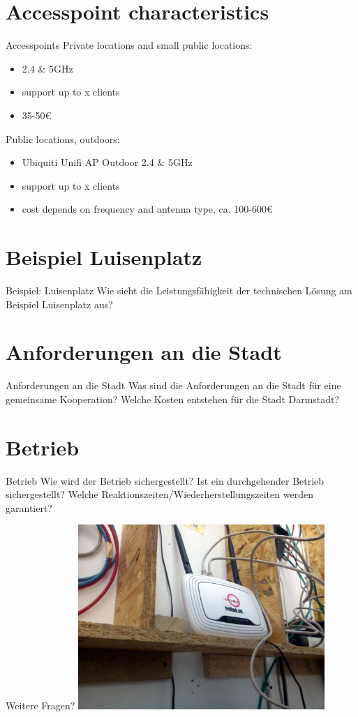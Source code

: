 \documentclass{beamer}
\begin{document}
\section{Accesspoint characteristics}
\begin{frame}{Accesspoints}
\vfill
Private locations and small public locations:
\begin{itemize}
\item 2.4 \& 5GHz
\item support up to x clients
\item 35-50\euro{}
\end{itemize}
\vfill

Public locations, outdoors:
\begin{itemize}
\item Ubiquiti Unifi AP Outdoor 2.4 \& 5GHz
\item support up to x clients
\item cost depends on frequency and antenna type, ca. 100-600\euro{}
\end{itemize}
\vfill
\end{frame}

\section{Beispiel Luisenplatz}
\begin{frame}{Beispiel: Luisenplatz}
Wie sieht die Leistungsfähigkeit der technischen Lösung am Beispiel Luisenplatz aus?
\end{frame}

\section{Anforderungen an die Stadt}
\begin{frame}{Anforderungen an die Stadt}
Was sind die Anforderungen an die Stadt für eine gemeinsame Kooperation?
Welche Kosten entstehen für die Stadt Darmstadt?
\end{frame}

\section{Betrieb}
\begin{frame}{Betrieb}
Wie wird der Betrieb sichergestellt?
Ist ein durchgehender Betrieb sichergestellt?
Welche Reaktionszeiten/Wiederherstellungszeiten werden garantiert?
\end{frame}










\begin{frame}{Weitere Fragen?}
\vfill
\centering
\includegraphics[width=0.7\textwidth]{images/irl_router}
\vfill
\end{frame}
\end{document}
